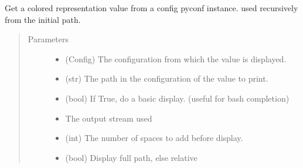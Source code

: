 \documentclass[a4paper,10pt,english]{sphinxmanual}
\begin{document}

\begin{fulllineitems}
\label{\detokenize{apidoc_src/src:src.configManager.getConfigColored}}
Get a colored representation value from a config pyconf instance.
used recursively from the initial path.
\begin{quote}\begin{description}
\item[{Parameters}] \leavevmode\begin{itemize}
\item {} 
 \textendash{} (Config) 
The configuration from which the value is displayed.

\item {} 
 \textendash{} (str) The path in the configuration of the value to print.

\item {} 
 \textendash{} (bool) 
If True, do a basic display. (useful for bash completion)

\item {} 
 \textendash{} The output stream used

\item {} 
 \textendash{} (int) The number of spaces to add before display.

\item {} 
 \textendash{} (bool) Display full path, else relative

\end{itemize}

\end{description}\end{quote}

\end{fulllineitems}

\end{document}
